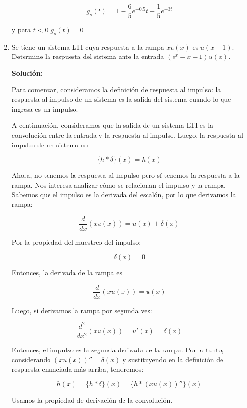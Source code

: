 \documentclass[letterpaper, 12pt]{article}
\newif\ifanswers
\begin{document}
\begin{enumerate}
{    \[
    g_s(t) = 1 - \frac{6}{5} e^{-0.5}t + \frac{1}{5} e^{-3t}
    \]

    y para $t < 0$ $g_s(t) = 0$
    
    
    }

    \fi


    \item Se tiene un sistema LTI cuya respuesta a la rampa \( xu(x) \) es \( u(x - 1) \). Determine la respuesta del sistema ante la entrada \( (e^x - x - 1)u(x) \).

    \ifanswers
    {\color{red}
    \textbf{Solución:}

    Para comenzar, consideramos la definición de respuesta al impulso: la respuesta al impulso de un sistema es la salida del sistema cuando lo que ingresa es un impulso.

    A continuación, consideramos que la salida de un sistema LTI es la convolución entre la entrada y la respuesta al impulso. Luego, la respuesta al impulso de un sistema es:

    \[
    \{h \ast \delta\} (x) = h(x)
    \]

    Ahora, no tenemos la respuesta al impulso pero sí tenemos la respuesta a la rampa. Nos interesa analizar cómo se relacionan el impulso y la rampa. Sabemos que el impulso es la derivada del escalón, por lo que derivamos la rampa:

    \[
    \frac{d}{dx}(xu(x)) = u(x) + \delta(x)
    \]

    Por la propiedad del muestreo del impulso:

    \[
    \delta(x) = 0
    \]

    Entonces, la derivada de la rampa es:

    \[
    \frac{d}{dx}(xu(x)) = u(x)
    \]

    Luego, si derivamos la rampa por segunda vez:

    \[
    \frac{d^2}{dx^2}(xu(x)) = u'(x) = \delta(x)
    \]

    Entonces, el impulso es la segunda derivada de la rampa. Por lo tanto, considerando \( (xu(x))'' = \delta(x) \) y sustituyendo en la definición de respuesta enunciada más arriba, tendremos:

    \[
    h(x) = \{h \ast \delta\} (x) = \{h \ast (xu(x))''\} (x)
    \]

    Usamos la propiedad de derivación de la convolución.

}
\end{enumerate}
\end{document}
